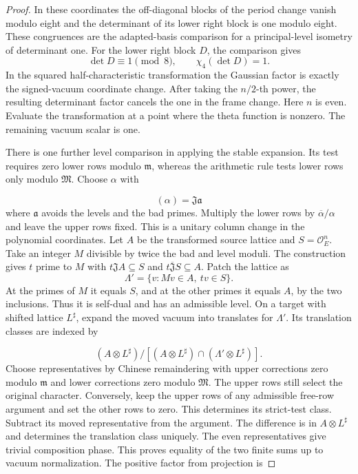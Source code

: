 \begin{proof}
In these
coordinates the off-diagonal blocks of the period change vanish
modulo eight and the determinant of its lower right block is
one modulo eight. These congruences are the adapted-basis
comparison for a principal-level isometry of determinant one.
For the lower right block \(D\), the comparison gives
\[
       \det D\equiv1\pmod8,\qquad \chi_4(\det D)=1 .
\]
In the squared half-characteristic transformation the
Gaussian factor is exactly the signed-vacuum coordinate change.
After taking the \(n/2\)-th power, the resulting determinant
factor cancels the one in the frame change. Here \(n\) is even. Evaluate the transformation
at a point where the theta function is nonzero. The remaining
vacuum scalar is one.
\label{cor:slice-marked-theta-cover-1}

There is one further level comparison in applying the stable
expansion. Its test requires zero lower rows modulo
\(\mathfrak m\), whereas the arithmetic rule tests lower rows
only modulo \(\mathfrak M\). Choose \(\alpha\) with

\[
  (\alpha)=\mathfrak J\mathfrak a
\]
 where \(\mathfrak a\) avoids
the levels and the bad primes. Multiply the lower rows by
\(\overline\alpha/\alpha\) and leave the upper rows fixed.
This is a unitary column change in the polynomial coordinates.
Let \(A\) be the transformed source lattice and \(S=\mathcal O_E^n\).
Take an integer \(M\) divisible by twice the bad and level
moduli. The construction gives \(t\) prime to \(M\) with
\(t\mathfrak J A\subseteq S\) and \(t\overline{\mathfrak J}S
\subseteq A\). Patch the lattice as
\[
              \Lambda'=\{v: Mv\in A,\ tv\in S\}.
\]
At the primes of \(M\) it equals \(S\), and at the other primes
it equals \(A\), by the two inclusions. Thus it is self-dual
and has an admissible level. On a target with shifted lattice
\(L^\sharp\), expand the moved vacuum into translates for
\(\Lambda'\). Its translation classes are indexed by

\[
  (A\otimes L^\sharp)/[(A\otimes L^\sharp)\cap
(\Lambda'\otimes L^\sharp)].
\]
 Choose representatives by
Chinese remaindering with upper corrections zero modulo
\(\mathfrak m\) and lower corrections zero modulo
\(\mathfrak M\). The upper rows still select the original
character. Conversely, keep the upper rows of any admissible
free-row argument and set the other rows to zero. This determines
its strict-test class. Subtract its moved representative from
the argument. The difference is in \(A\otimes L^\sharp\) and
determines the translation class uniquely. The even representatives
give trivial composition phase. This proves equality of the
two finite sums up to vacuum normalization. The positive factor
from projection is


\end{proof}
